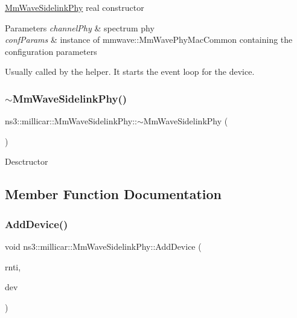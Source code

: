 \hyperlink{classns3_1_1millicar_1_1MmWaveSidelinkPhy}{Mm\+Wave\+Sidelink\+Phy} real constructor 
\begin{DoxyParams}{Parameters}
{\em channel\+Phy} & spectrum phy \\
\hline
{\em conf\+Params} & instance of mmwave\+::\+Mm\+Wave\+Phy\+Mac\+Common containing the configuration parameters\\
\hline
\end{DoxyParams}
Usually called by the helper. It starts the event loop for the device. \mbox{\label{classns3_1_1millicar_1_1MmWaveSidelinkPhy_ab0a97172cbc36ed6d0357761ca06af92}} 
\subsubsection{\texorpdfstring{$\sim$\+Mm\+Wave\+Sidelink\+Phy()}{~MmWaveSidelinkPhy()}}
{\footnotesize\ttfamily ns3\+::millicar\+::\+Mm\+Wave\+Sidelink\+Phy\+::$\sim$\+Mm\+Wave\+Sidelink\+Phy (\begin{DoxyParamCaption}{ }\end{DoxyParamCaption})\hspace{0.3cm}{\ttfamily [virtual]}}

Desctructor 

\subsection{Member Function Documentation}
\mbox{\label{classns3_1_1millicar_1_1MmWaveSidelinkPhy_a8dbf76a5946b77c520dbcc2313c32bf6}} 
\subsubsection{\texorpdfstring{Add\+Device()}{AddDevice()}}
{\footnotesize\ttfamily void ns3\+::millicar\+::\+Mm\+Wave\+Sidelink\+Phy\+::\+Add\+Device (\begin{DoxyParamCaption}\item[{uint64\+\_\+t}]{rnti,  }\item[{Ptr$<$ Net\+Device $>$}]{dev }\end{DoxyParamCaption})}

